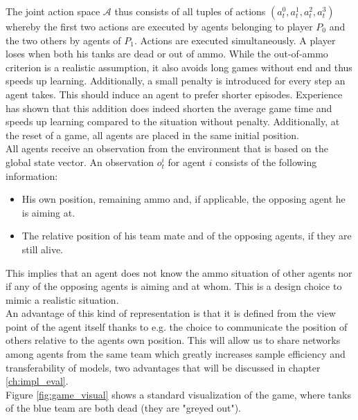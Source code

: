 The joint action space $\mathcal{A}$ thus consists of all tuples of actions $(a_t^0, a_t^1, a_t^2, a_t^3)$ whereby the first two actions are executed by agents belonging to player $P_0$ and the two others by agents of $P_1$. Actions are executed simultaneously. A player loses when both his tanks are dead or out of ammo. While the out-of-ammo criterion is a realistic assumption, it also avoids long games without end and thus speeds up learning. Additionally, a small penalty is introduced for every step an agent takes. This should induce an agent to prefer shorter episodes. Experience has shown that this addition does indeed shorten the average game time and speeds up learning compared to the situation without penalty. Additionally, at the reset of a game, all agents are placed in the same initial position.\\
All agents receive an observation from the environment that is based on the global state vector. An observation $o^i_t$ for agent $i$ consists of the following information:
\begin{itemize}
    \item His own position, remaining ammo and, if applicable, the opposing agent he is aiming at.
    \item The relative position of his team mate and of the opposing agents, if they are still alive.
\end{itemize}
This implies that an agent does not know the ammo situation of other agents nor if any of the opposing agents is aiming and at whom. This is a design choice to mimic a realistic situation.\\
An advantage of this kind of representation is that it is defined from the view point of the agent itself thanks to e.g. the choice to communicate the position of others relative to the agents own position. This will allow us to share networks among agents from the same team which greatly increases sample efficiency and transferability of models, two advantages that will be discussed in chapter \ref{ch:impl_eval}.\\
Figure \ref{fig:game_visual} shows a standard visualization of the game, where tanks of the blue team are both dead (they are "greyed out").

